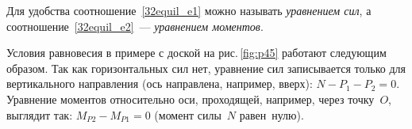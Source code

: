 \documentclass[main.tex]{subfiles}
\begin{document}
Для удобства соотношение~\eqref{32equil_e1} можно называть \emph{уравнением сил}, а соотношение~\eqref{32equil_e2}~--- \emph{уравнением моментов}.

Условия равновесия в примере с доской на рис.\,\ref{fig:p45} работают следующим образом. Так как горизонтальных сил нет, уравнение сил записывается только для вертикального направления (ось направлена, например, вверх): $N-P_1-P_2=0$. Уравнение моментов относительно оси, проходящей, например, через точку~$O$, выглядит так: $M_{P2}-M_{P1}=0$ (момент силы~$N$ равен~нулю).



 
\end{document}
